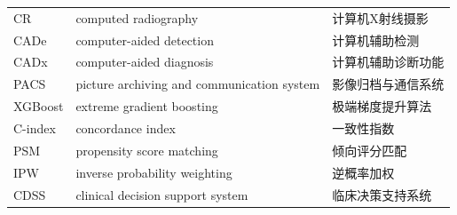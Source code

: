\begin{center}
\begin{longtable}{p{}p{}p{}}
CR & computed radiography & 计算机X射线摄影\\
CADe & computer-aided detection & 计算机辅助检测\\
CADx & computer-aided diagnosis & 计算机辅助诊断功能\\
PACS & picture archiving and communication system & 影像归档与通信系统\\
XGBoost & extreme gradient boosting & 极端梯度提升算法\\
C-index & concordance index & 一致性指数\\
PSM & propensity score matching & 倾向评分匹配\\
IPW & inverse probability weighting & 逆概率加权\\
CDSS & clinical decision support system & 临床决策支持系统\\
\bottomrule
\end{longtable}
\end{center}
